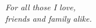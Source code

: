 


\thispagestyle{empty}
{}

\vspace*{5cm}

\begin{center}
    \textit{For all those I love,\\friends and family alike.}
\end{center}


